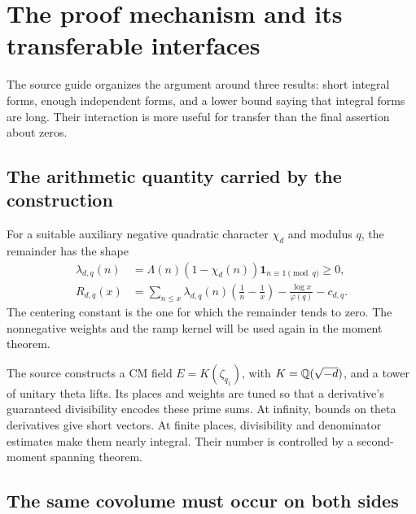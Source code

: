 \section{The proof mechanism and its transferable interfaces}

The source guide organizes the argument around three results: short integral forms, enough independent forms, and a lower bound saying that integral forms are long. Their interaction is more useful for transfer than the final assertion about zeros.\cite{source}

\subsection{The arithmetic quantity carried by the construction}

For a suitable auxiliary negative quadratic character $\chi_d$ and modulus $q$, the remainder has the shape
\begin{align*}
 \lambda_{d,q}(n)&=\Lambda(n)(1-\chi_d(n))\mathbf1_{n\equiv1\pmod q}\ge0,\\
 R_{d,q}(x)&=\sum_{n\le x}\lambda_{d,q}(n)
       \left(\frac1n-\frac1x\right)-\frac{\log x}{\varphi(q)}-c_{d,q}.
\end{align*}
The centering constant is the one for which the remainder tends to zero. The nonnegative weights and the ramp kernel will be used again in the moment theorem.

The source constructs a CM field $E=K(\zeta_{q_1})$, with $K=\mathbb Q(\sqrt{-d})$, and a tower of unitary theta lifts. Its places and weights are tuned so that a derivative's guaranteed divisibility encodes these prime sums. At infinity, bounds on theta derivatives give short vectors. At finite places, divisibility and denominator estimates make them nearly integral. Their number is controlled by a second-moment spanning theorem.

\subsection{The same covolume must occur on both sides}

